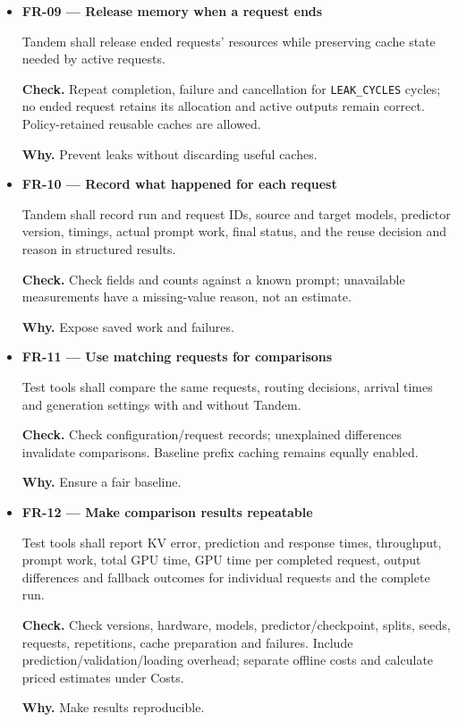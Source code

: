 \documentclass[12pt]{article}
\begin{document}
\begin{itemize}
\item {}\label{req:FR-09}
\textbf{FR-09 --- Release memory when a request ends}\par
Tandem shall release ended requests' resources while preserving cache state needed by active requests.\par
\textbf{Check.} Repeat completion, failure and cancellation for \texttt{LEAK\_CYCLES} cycles; no ended request retains its allocation and active outputs remain correct. Policy-retained reusable caches are allowed.\par
\textbf{Why.} Prevent leaks without discarding useful caches.


\item {}\label{req:FR-10}
\textbf{FR-10 --- Record what happened for each request}\par
Tandem shall record run and request IDs, source and target models, predictor version, timings, actual prompt work, final status, and the reuse decision and reason in structured results.\par
\textbf{Check.} Check fields and counts against a known prompt; unavailable measurements have a missing-value reason, not an estimate.\par
\textbf{Why.} Expose saved work and failures.


\item {}\label{req:FR-11}
\textbf{FR-11 --- Use matching requests for comparisons}\par
Test tools shall compare the same requests, routing decisions, arrival times and generation settings with and without Tandem.\par
\textbf{Check.} Check configuration/request records; unexplained differences invalidate comparisons. Baseline prefix caching remains equally enabled.\par
\textbf{Why.} Ensure a fair baseline.


\item {}\label{req:FR-12}
\textbf{FR-12 --- Make comparison results repeatable}\par
Test tools shall report KV error, prediction and response times, throughput, prompt work, total GPU time, GPU time per completed request, output differences and fallback outcomes for individual requests and the complete run.\par
\textbf{Check.} Check versions, hardware, models, predictor/checkpoint, splits, seeds, requests, repetitions, cache preparation and failures. Include prediction/validation/loading overhead; separate offline costs and calculate priced estimates under Costs.\par
\textbf{Why.} Make results reproducible.



\end{itemize}
\end{document}
